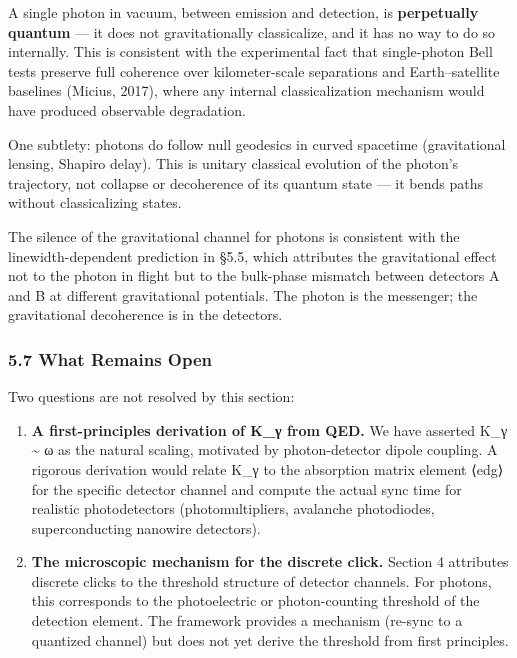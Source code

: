 \documentclass[
]{article}
\providecommand{\tightlist}{%
  \setlength{\itemsep}{0pt}\setlength{\parskip}{0pt}}
\begin{document}
A single photon in vacuum, between emission and detection, is
\textbf{perpetually quantum} --- it does not gravitationally
classicalize, and it has no way to do so internally. This is consistent
with the experimental fact that single-photon Bell tests preserve full
coherence over kilometer-scale separations and Earth--satellite
baselines (Micius, 2017), where any internal classicalization mechanism
would have produced observable degradation.

One subtlety: photons do follow null geodesics in curved spacetime
(gravitational lensing, Shapiro delay). This is unitary classical
evolution of the photon's trajectory, not collapse or decoherence of its
quantum state --- it bends paths without classicalizing states.

The silence of the gravitational channel for photons is consistent with
the linewidth-dependent prediction in §5.5, which attributes the
gravitational effect not to the photon in flight but to the bulk-phase
mismatch between detectors A and B at different gravitational
potentials. The photon is the messenger; the gravitational decoherence
is in the detectors.

\subsubsection{5.7 What Remains Open}\label{what-remains-open}

Two questions are not resolved by this section:

\begin{enumerate}
\def\labelenumi{\arabic{enumi}.}
\tightlist
\item
  \textbf{A first-principles derivation of K\_γ from QED.} We have
  asserted K\_γ \textasciitilde{} ω as the natural scaling, motivated by
  photon-detector dipole coupling. A rigorous derivation would relate
  K\_γ to the absorption matrix element ⟨e\textbar d\textbar g⟩ for the
  specific detector channel and compute the actual sync time for
  realistic photodetectors (photomultipliers, avalanche photodiodes,
  superconducting nanowire detectors).
\item
  \textbf{The microscopic mechanism for the discrete click.} Section 4
  attributes discrete clicks to the threshold structure of detector
  channels. For photons, this corresponds to the photoelectric or
  photon-counting threshold of the detection element. The framework
  provides a mechanism (re-sync to a quantized channel) but does not yet
  derive the threshold from first principles.
\end{enumerate}
\end{document}
